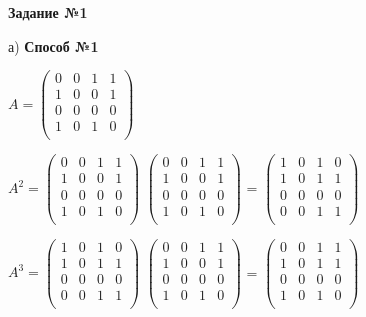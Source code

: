 \documentclass{article}
\begin{document}
\newpage
\large
\begin{center}
		\textbf{Задание №1}
\end{center}
\par
а) \textbf{Способ №1}
\vspace{5mm}
\par \hspace{8mm} $A = 
\begin{pmatrix}
	0 & 0 & 1 & 1\\
	1 & 0 & 0 & 1\\
	0 & 0 & 0 & 0\\
	1 & 0 & 1 & 0\\
\end{pmatrix}$
\vspace{5mm}
\par

\hspace{8mm} $A^2 = 
\begin{pmatrix}
	0 & 0 & 1 & 1\\
	1 & 0 & 0 & 1\\
	0 & 0 & 0 & 0\\
	1 & 0 & 1 & 0\\
\end{pmatrix}$
$\begin{pmatrix}
	0 & 0 & 1 & 1\\
	1 & 0 & 0 & 1\\
	0 & 0 & 0 & 0\\
	1 & 0 & 1 & 0\\
\end{pmatrix}$ =
$\begin{pmatrix}
	1 & 0 & 1 & 0\\
	1 & 0 & 1 & 1\\
	0 & 0 & 0 & 0\\
	0 & 0 & 1 & 1\\
\end{pmatrix}$ 

\vspace{5mm}
\par

\hspace{8mm} $A^3 = 
\begin{pmatrix}
	1 & 0 & 1 & 0\\
	1 & 0 & 1 & 1\\
	0 & 0 & 0 & 0\\
	0 & 0 & 1 & 1\\
\end{pmatrix}$
$\begin{pmatrix}
	0 & 0 & 1 & 1\\
	1 & 0 & 0 & 1\\
	0 & 0 & 0 & 0\\
	1 & 0 & 1 & 0\\
\end{pmatrix}$ =
$\begin{pmatrix}
	0 & 0 & 1 & 1\\
	1 & 0 & 1 & 1\\
	0 & 0 & 0 & 0\\
	1 & 0 & 1 & 0\\
\end{pmatrix}$ 
\end{document}
